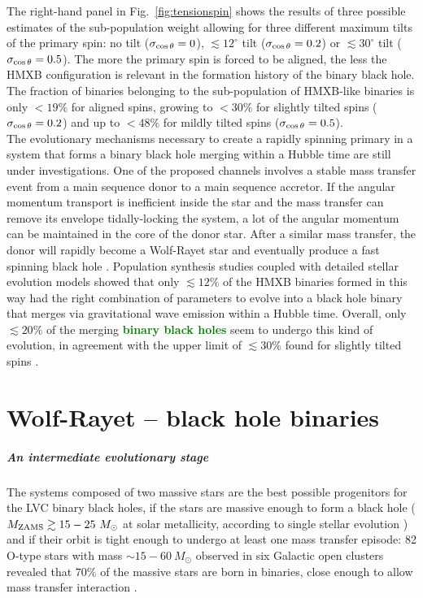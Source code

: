 \documentclass[a4paper,titlepage]{book}     	%
\newcommand{\sun}{\ensuremath{_\odot}}
\newcommand{\mzams}{M_\textup{ZAMS}}
\newcommand{\msun}{\ensuremath{M\sun}}
\newcommand{\erika}[1]{\textcolor{green}{\bf#1}}
\begin{document}
The right-hand panel in Fig.\ \ref{fig:tensionspin} shows the results of three possible estimates of the sub-population weight allowing for three different maximum tilts of the primary spin: no tilt ($\sigma_{\rm \cos \theta} = 0$), $\lesssim 12^{\circ}$ tilt ($\sigma_{\rm \cos \theta} = 0.2$) or $\lesssim 30^{\circ}$ tilt ($\sigma_{\rm \cos \theta} = 0.5$). The more the primary spin is forced to be aligned, the less the HMXB configuration is relevant in the formation history of the binary black hole. The fraction of binaries belonging to the sub-population of HMXB-like binaries is only $< 19 \% $ for aligned spins, growing to $< 30 \%$ for slightly tilted spins ($\sigma_{\rm \cos \theta} = 0.2$) and up to $< 48 \%$ for mildly tilted spins ($\sigma_{\rm \cos \theta} = 0.5$).\\

The evolutionary mechanisms necessary to create a rapidly spinning primary in a system that forms a binary black hole merging within a Hubble time are still under investigations. One of the proposed channels involves a stable mass transfer event from a main sequence donor to a main sequence accretor. If the angular momentum transport is inefficient inside the star and the mass transfer can remove its envelope tidally-locking the system, a lot of the angular momentum can be maintained in the core of the donor star. After a similar mass transfer, the donor will rapidly become a Wolf-Rayet star and eventually produce a fast spinning black hole \cite{spinfastBH_Qin2019}. Population synthesis studies coupled with detailed stellar evolution models showed that only $\lesssim 12 \%$ of the HMXB binaries formed in this way had the right combination of parameters to evolve into a black hole binary that merges via gravitational wave emission within a Hubble time. Overall, only $\lesssim 20 \%$ of the merging \erika{binary black holes} seem to undergo this kind of evolution, in agreement with the upper limit of $\lesssim 30 \%$ found for slightly tilted spins \cite{HMXBHspins2022}.





\chapter{Wolf-Rayet -- black hole binaries}
\paragraph{An intermediate evolutionary stage}
The systems composed of two massive stars are the best possible progenitors for the LVC binary black holes, if the stars are massive enough to form a black hole ($\mzams \gtrsim 15-25~\msun$ at solar metallicity, according to single stellar evolution \cite{Limongi2017_handbookSN}) and if their orbit is tight enough to undergo at least one mass transfer episode: 82 O-type stars with mass $\sim 15-60~\msun$ observed in six Galactic open clusters revealed that $70 \%$ of the massive stars are born in binaries, close enough to allow mass transfer interaction \cite{Sana2012}. 
\end{document}
